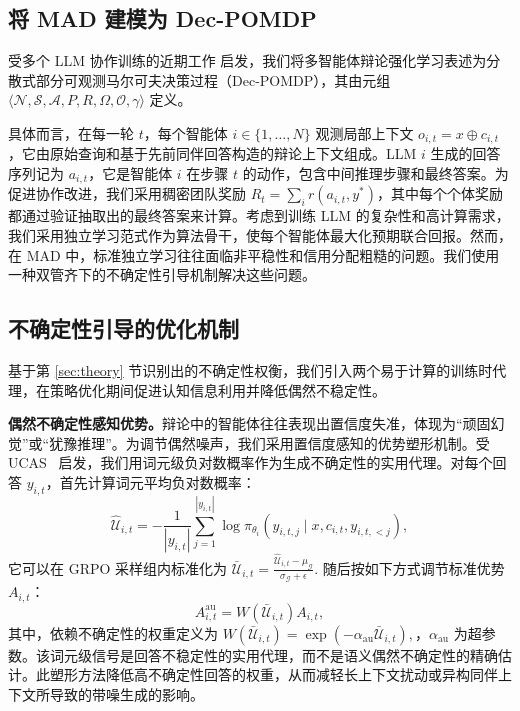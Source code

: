 \documentclass{article}
\theoremstyle{plain}
\theoremstyle{definition}
\theoremstyle{remark}
\begin{document}
\subsection{将 MAD 建模为 Dec-POMDP} \label{subsec:MAD_POMDP}

受多个 LLM 协作训练的近期工作 \cite{park2025maporl,liao2025marft, wan2025rema} 启发，我们将多智能体辩论强化学习表述为分散式部分可观测马尔可夫决策过程（Dec-POMDP）\cite{oliehoek2016concise}，其由元组 $\langle \mathcal{N}, \mathcal{S}, \mathcal{A}, P, R, \Omega, \mathcal{O}, \gamma \rangle$ 定义。

具体而言，在每一轮 $t$，每个智能体 $i \in \{1, \dots, N\}$ 观测局部上下文 $o_{i,t}=x\oplus c_{i,t}$，它由原始查询和基于先前同伴回答构造的辩论上下文组成。LLM $i$ 生成的回答序列记为 $a_{i,t}$，它是智能体 $i$ 在步骤 $t$ 的动作，包含中间推理步骤和最终答案。为促进协作改进，我们采用稠密团队奖励 $R_t = \sum_i r(a_{i,t}, y^*)$，其中每个个体奖励都通过验证抽取出的最终答案来计算。考虑到训练 LLM 的复杂性和高计算需求，我们采用独立学习范式作为算法骨干，使每个智能体最大化预期联合回报。然而，在 MAD 中，标准独立学习往往面临非平稳性和信用分配粗糙的问题。我们使用一种双管齐下的不确定性引导机制解决这些问题。


\subsection{不确定性引导的优化机制} \label{sec:mechanisms}

基于第 \ref{sec:theory} 节识别出的不确定性权衡，我们引入两个易于计算的训练时代理，在策略优化期间促进认知信息利用并降低偶然不稳定性。




\textbf{偶然不确定性感知优势。}辩论中的智能体往往表现出置信度失准，体现为“顽固幻觉”或“犹豫推理”。为调节偶然噪声，我们采用置信度感知的优势塑形机制。受 UCAS~\cite{xie2025unlocking} 启发，我们用词元级负对数概率作为生成不确定性的实用代理。对每个回答 $y_{i,t}$，首先计算词元平均负对数概率：
\begin{equation*}
\hat{\mathcal{U}}_{i,t}
=
-\frac{1}{|y_{i,t}|}
\sum_{j=1}^{|y_{i,t}|}
\log \pi_{\theta_i}(y_{i,t,j}\mid x,c_{i,t},y_{i,t,<j}),
\end{equation*}
它可以在 GRPO 采样组内标准化为 $
\bar{\mathcal{U}}_{i,t}
=
\frac{\hat{\mathcal{U}}_{i,t}-\mu_{\mathcal{G}}}{\sigma_{\mathcal{G}}+\epsilon}.$ 随后按如下方式调节标准优势 $A_{i,t}$：
\begin{equation}
A^{\mathrm{au}}_{i,t}
=
W(\bar{\mathcal{U}}_{i,t}) A_{i,t},
\end{equation}
其中，依赖不确定性的权重定义为
$W(\bar{\mathcal{U}}_{i,t})
=
\exp(-\alpha_{\mathrm{au}}\bar{\mathcal{U}}_{i,t}),
$，$\alpha_{\mathrm{au}}$ 为超参数。该词元级信号是回答不稳定性的实用代理，而不是语义偶然不确定性的精确估计。此塑形方法降低高不确定性回答的权重，从而减轻长上下文扰动或异构同伴上下文所导致的带噪生成的影响。
\end{document}
